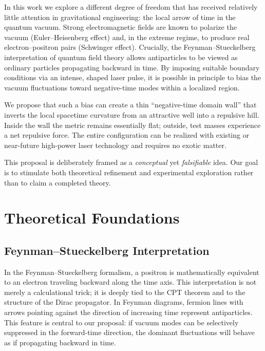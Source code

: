 \documentclass[11pt,a4paper]{article}
\begin{document}
In this work we explore a different degree of freedom that has received relatively little attention in gravitational engineering: the local arrow of time in the quantum vacuum. Strong electromagnetic fields are known to polarize the vacuum (Euler--Heisenberg effect) and, in the extreme regime, to produce real electron--positron pairs (Schwinger effect). Crucially, the Feynman--Stueckelberg interpretation of quantum field theory allows antiparticles to be viewed as ordinary particles propagating backward in time. By imposing suitable boundary conditions via an intense, shaped laser pulse, it is possible in principle to bias the vacuum fluctuations toward negative-time modes within a localized region.

We propose that such a bias can create a thin ``negative-time domain wall'' that inverts the local spacetime curvature from an attractive well into a repulsive hill. Inside the wall the metric remains essentially flat; outside, test masses experience a net repulsive force. The entire configuration can be realized with existing or near-future high-power laser technology and requires no exotic matter.

This proposal is deliberately framed as a \textit{conceptual} yet \textit{falsifiable} idea. Our goal is to stimulate both theoretical refinement and experimental exploration rather than to claim a completed theory.

\section{Theoretical Foundations}

\subsection{Feynman--Stueckelberg Interpretation}

In the Feynman--Stueckelberg formalism, a positron is mathematically equivalent to an electron traveling backward along the time axis. This interpretation is not merely a calculational trick; it is deeply tied to the CPT theorem and to the structure of the Dirac propagator. In Feynman diagrams, fermion lines with arrows pointing against the direction of increasing time represent antiparticles. This feature is central to our proposal: if vacuum modes can be selectively suppressed in the forward-time direction, the dominant fluctuations will behave as if propagating backward in time.
\end{document}
